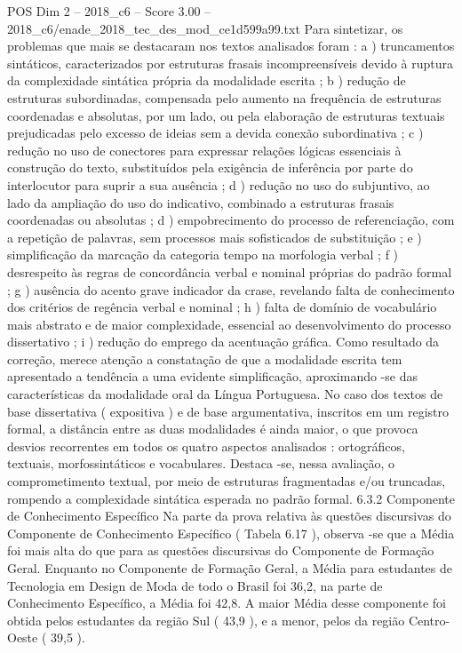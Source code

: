 \begin{textsample}{POS Dim 2 – 2018\_c6 – Score 3.00 – 2018\_c6/enade\_2018\_tec\_des\_mod\_ce1d599a99.txt}
Para sintetizar, os problemas que mais se destacaram nos textos analisados foram : a ) truncamentos sintáticos, caracterizados por estruturas frasais incompreensíveis devido à ruptura da complexidade sintática própria da modalidade escrita ; b ) redução de estruturas subordinadas, compensada pelo aumento na frequência de estruturas coordenadas e absolutas, por um lado, ou pela elaboração de estruturas textuais prejudicadas pelo excesso de ideias sem a devida conexão subordinativa ; c ) redução no uso de conectores para expressar relações lógicas essenciais à construção do texto, substituídos pela exigência de inferência por parte do interlocutor para suprir a sua ausência ; d ) redução no uso do subjuntivo, ao lado da ampliação do uso do indicativo, combinado a estruturas frasais coordenadas ou absolutas ; d ) empobrecimento do processo de referenciação, com a repetição de palavras, sem processos mais sofisticados de substituição ; e ) simplificação da marcação da categoria tempo na morfologia verbal ; f ) desrespeito às regras de concordância verbal e nominal próprias do padrão formal ; g ) ausência do acento grave indicador da crase, revelando falta de conhecimento dos critérios de regência verbal e nominal ; h ) falta de domínio de vocabulário mais abstrato e de maior complexidade, essencial ao desenvolvimento do processo dissertativo ; i ) redução do emprego da acentuação gráfica.
Como resultado da correção, merece atenção a constatação de que a modalidade escrita tem apresentado a tendência a uma evidente simplificação, aproximando -se das características da modalidade oral da Língua Portuguesa.
No caso dos textos de base dissertativa ( expositiva ) e de base argumentativa, inscritos em um registro formal, a distância entre as duas modalidades é ainda maior, o que provoca desvios recorrentes em todos os quatro aspectos analisados : ortográficos, textuais, morfossintáticos e vocabulares.
Destaca -se, nessa avaliação, o comprometimento textual, por meio de estruturas fragmentadas e/ou truncadas, rompendo a complexidade sintática esperada no padrão formal. 6.3.2 Componente de Conhecimento Específico Na parte da prova relativa às questões discursivas do Componente de Conhecimento Específico ( Tabela 6.17 ), observa -se que a Média foi mais alta do que para as questões discursivas do Componente de Formação Geral.
Enquanto no Componente de Formação Geral, a Média para estudantes de Tecnologia em Design de Moda de todo o Brasil foi 36,2, na parte de Conhecimento Específico, a Média foi 42,8.
A maior Média desse componente foi obtida pelos estudantes da região Sul ( 43,9 ), e a menor, pelos da região Centro-Oeste ( 39,5 ).

\end{textsample}
